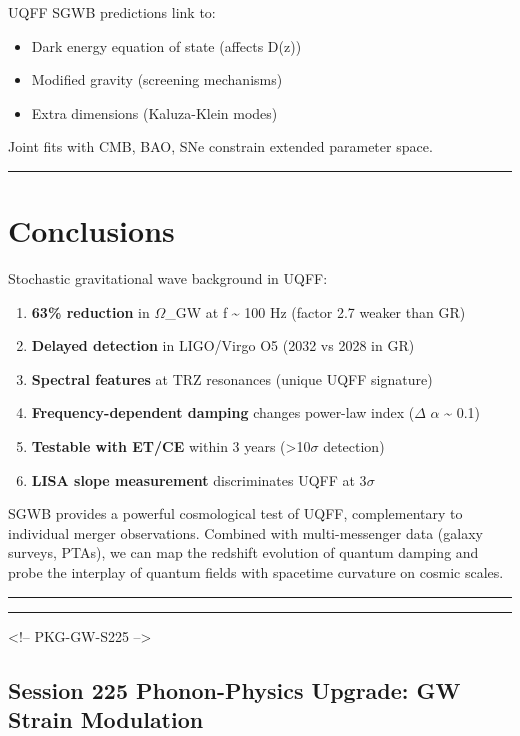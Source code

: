 \documentclass[12pt,a4paper]{article}
\begin{document}
UQFF SGWB predictions link to:

\begin{itemize}
  \item Dark energy equation of state (affects D(z))
  \item Modified gravity (screening mechanisms)
  \item Extra dimensions (Kaluza-Klein modes)
\end{itemize}

Joint fits with CMB, BAO, SNe constrain extended parameter space.

\medskip\hrule\medskip

\section{Conclusions}

Stochastic gravitational wave background in UQFF:

\begin{enumerate}
  \item \textbf{63\% reduction} in $\Omega$\_GW at f \textasciitilde{} 100 Hz (factor 2.7 weaker than GR)
  \item \textbf{Delayed detection} in LIGO/Virgo O5 (2032 vs 2028 in GR)
  \item \textbf{Spectral features} at TRZ resonances (unique UQFF signature)
  \item \textbf{Frequency-dependent damping} changes power-law index ($\Delta$ $\alpha$ \textasciitilde{} 0.1)
  \item \textbf{Testable with ET/CE} within 3 years (>10$\sigma$ detection)
  \item \textbf{LISA slope measurement} discriminates UQFF at 3$\sigma$
\end{enumerate}

SGWB provides a powerful cosmological test of UQFF, complementary to individual merger observations. Combined with multi-messenger data (galaxy surveys, PTAs), we can map the redshift evolution of quantum damping and probe the interplay of quantum fields with spacetime curvature on cosmic scales.

\medskip\hrule\medskip

\medskip\hrule\medskip

<!-- PKG-GW-S225 -->

\subsection{Session 225 Phonon-Physics Upgrade: GW Strain Modulation}
\end{document}

